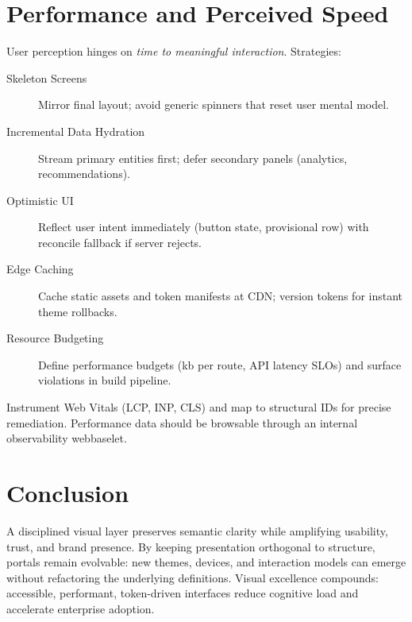 \section{Performance and Perceived Speed}
User perception hinges on \textit{time to meaningful interaction}. Strategies:
\begin{description}
	\item[Skeleton Screens] Mirror final layout; avoid generic spinners that reset user mental model.
	\item[Incremental Data Hydration] Stream primary entities first; defer secondary panels (analytics, recommendations).
	\item[Optimistic UI] Reflect user intent immediately (button state, provisional row) with reconcile fallback if server rejects.
	\item[Edge Caching] Cache static assets and token manifests at CDN; version tokens for instant theme rollbacks.
	\item[Resource Budgeting] Define performance budgets (kb per route, API latency SLOs) and surface violations in build pipeline.
\end{description}
Instrument Web Vitals (LCP, INP, CLS) and map to structural IDs for precise remediation. Performance data should be browsable through an internal observability webbaselet.

\section{Conclusion}
A disciplined visual layer preserves semantic clarity while amplifying usability, trust, and brand presence. By keeping presentation orthogonal to structure, portals remain evolvable: new themes, devices, and interaction models can emerge without refactoring the underlying \wbol{} definitions. Visual excellence compounds: accessible, performant, token-driven interfaces reduce cognitive load and accelerate enterprise adoption.

